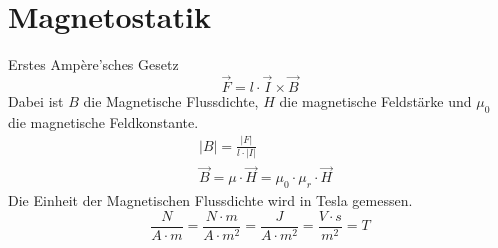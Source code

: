 \section{Magnetostatik}

Erstes Ampère'sches Gesetz
\[
	\vec{F} = l \cdot \vec{I} \times \vec{B}
\]
Dabei ist $B$ die Magnetische Flussdichte, $H$ die magnetische Feldstärke und
$\mu_0$ die magnetische Feldkonstante.
\begin{align*}
	& |B| = \frac{|F|}{l \cdot |I|} \hspace{3em} \\
	& \vec{B} = \mu \cdot \vec{H} = \mu_0 \cdot \mu_r \cdot \vec{H}
\end{align*}
Die Einheit der
Magnetischen Flussdichte wird in Tesla gemessen.
\[
	\frac{N}{A \cdot m}
	= \frac{N \cdot m}{A \cdot m^2}
	= \frac{J}{A \cdot m^2}
	= \frac{V \cdot s}{m^2}
	= T
\]

